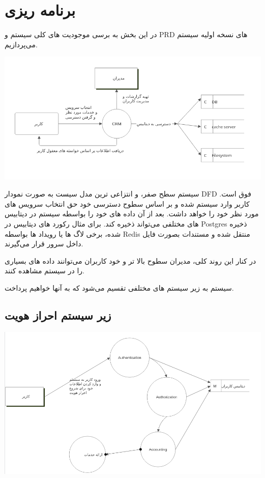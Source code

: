 \section{برنامه ریزی}
در این بخش به برسی موجودیت های کلی سیستم و PRD های نسخه اولیه سیستم می‌پردازیم.

\includegraphics[scale=0.8]{assets/0_level_system.png}

سیستم سطح صفر، و انتزاعی ترین مدل سیست به صورت نمودار DFD فوق است.
کاربر وارد سیستم شده و بر اساس سطوح دسترسی خود حق انتخاب سرویس های مورد نظر خود را خواهد داشت. بعد از آن
داده های خود را بواسطه سیستم در دیتابیس های مختلفی می‌تواند ذخیره کند.
برای مثال رکورد های دیتابیس در Postgres ذخیره شده، برخی لاگ ها یا رویداد ها بواسطه Redis منتقل شده و مستندات بصورت فایل داخل سرور قرار می‌گیرند.

در کنار این روند کلی، مدیران سطوح بالا تر و خود کاربران می‌توانند داده های بسیاری را در سیستم مشاهده کنند.

سیستم به زیر سیستم های مختلفی تقسیم می‌شود که به آنها خواهیم پرداخت.

\subsection{زیر سیستم احراز هویت}
\includegraphics[scale=0.8]{assets/auth_dfd.png}

